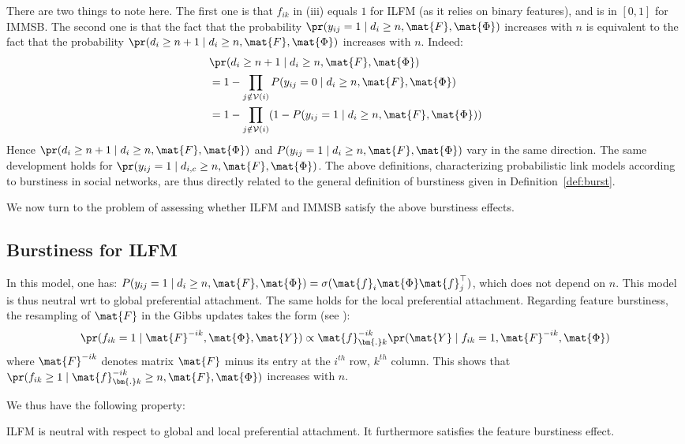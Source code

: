 %
There are two things to note here. The first one is that $f_{ik}$ in (iii) equals $1$ for ILFM (as it relies on binary features), and is in $[0,1]$ for IMMSB. The second one is that the fact that the probability $\pr(y_{ij}=1 \mid d_i \ge n, \mat{F}, \mat{\Phi})$ increases with $n$ is equivalent to the fact that the probability $\pr(d_{i} \ge n+1 \mid d_i \ge n, \mat{F}, \mat{\Phi})$ increases with $n$. Indeed:
%
\begin{align}
&\pr(d_{i} \ge n+1 \mid d_i \ge n, \mat{F}, \mat{\Phi}) \nonumber \\
&= 1 - \prod_{j \notin \mathcal{V}(i)} P(y_{ij} = 0 \mid d_i \ge n, \mat{F}, \mat{\Phi}) \nonumber \\
&= 1 - \prod_{j \notin \mathcal{V}(i)} (1 - P(y_{ij} = 1 \mid d_i \ge n, \mat{F}, \mat{\Phi})) \nonumber
\end{align}
%
Hence $\pr(d_{i} \ge n+1 \mid d_i \ge n, \mat{F}, \mat{\Phi})$ and $P(y_{ij} = 1 \mid d_i \ge n, \mat{F}, \mat{\Phi})$ vary in the same direction. The same development holds for $\pr(y_{ij}=1 \mid d_{i,c} \ge n, \mat{F}, \mat{\Phi})$. The above definitions, characterizing probabilistic link models according to burstiness in social networks, are thus directly related to the general definition of burstiness given in Definition~\ref{def:burst}.

We now turn to the problem of assessing whether ILFM and IMMSB satisfy the above burstiness effects.

\subsection{Burstiness for ILFM}

In this model, one has: $P(y_{ij} = 1 \mid d_i \ge n, \mat{F}, \mat{\Phi}) = \sigma(\mat{f}_i \mat{\Phi} \mat{f}_j^\top)$, which does not depend on $n$. This model is thus neutral wrt to global preferential attachment. The same holds for the local preferential attachment. Regarding feature burstiness, the resampling of $\mat{F}$ in the Gibbs updates takes the form (see \cite{ILFRM}):
%
\[
\pr(f_{ik} = 1 \mid \mat{F}^{-ik},\mat{\Phi}, \mat{Y}) \propto \mat{f}_{\bm{.}k}^{-ik} \pr(\mat{Y} \mid f_{ik} = 1,\mat{F}^{-ik},\mat{\Phi})
\]
%
where $\mat{F}^{-ik}$ denotes matrix $\mat{F}$ minus its entry at the $i^{th}$ row, $k^{th}$ column. This shows that $\pr(f_{ik} \ge 1 \mid \mat{f}_{\bm{.}k}^{-ik} \ge n, \mat{F}, \mat{\Phi})$ increases with $n$.

We thus have the following property:
%
\begin{proposition}
ILFM is neutral with respect to global and local preferential attachment. It furthermore satisfies the feature burstiness effect.
\end{proposition}

